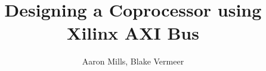 \documentclass[journal]{IEEEtran}
\begin{document}
%
\title{Designing a Coprocessor using Xilinx AXI Bus }
%
%
%

\author{Aaron Mills, Blake Vermeer}%


% 
%



%
{}
% 




\end{document}
